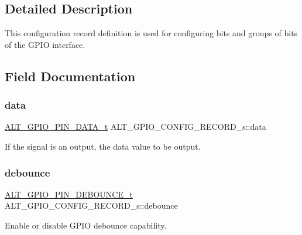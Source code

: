 \subsection{Detailed Description}
This configuration record definition is used for configuring bits and groups of bits of the G\+P\+IO interface. 

\subsection{Field Documentation}
\mbox{\label{structALT__GPIO__CONFIG__RECORD__s_aa4d457f43ced1bb62fea14cdc92793c1}} 
\subsubsection{\texorpdfstring{data}{data}}
{\footnotesize\ttfamily \mbox{\hyperlink{group__ALT__GPIO__API__CONFIG_ga757cd8797c8bb2ed86d75d961ce9041b}{A\+L\+T\+\_\+\+G\+P\+I\+O\+\_\+\+P\+I\+N\+\_\+\+D\+A\+T\+A\+\_\+t}} A\+L\+T\+\_\+\+G\+P\+I\+O\+\_\+\+C\+O\+N\+F\+I\+G\+\_\+\+R\+E\+C\+O\+R\+D\+\_\+s\+::data}

If the signal is an output, the data value to be output. \mbox{\label{structALT__GPIO__CONFIG__RECORD__s_a9c3d5641af7871520e43c6b721734661}} 
\subsubsection{\texorpdfstring{debounce}{debounce}}
{\footnotesize\ttfamily \mbox{\hyperlink{group__ALT__GPIO__API__CONFIG_gac48653c26697d3fd17d9029252655ac2}{A\+L\+T\+\_\+\+G\+P\+I\+O\+\_\+\+P\+I\+N\+\_\+\+D\+E\+B\+O\+U\+N\+C\+E\+\_\+t}} A\+L\+T\+\_\+\+G\+P\+I\+O\+\_\+\+C\+O\+N\+F\+I\+G\+\_\+\+R\+E\+C\+O\+R\+D\+\_\+s\+::debounce}

Enable or disable G\+P\+IO debounce capability. \mbox{\label{structALT__GPIO__CONFIG__RECORD__s_a65a176e2de024aa2aec5b618282997f8}} 
